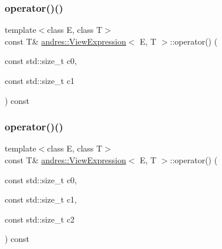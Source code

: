 \subsubsection{\texorpdfstring{operator()()}{operator()()}\hspace{0.1cm}{\footnotesize\ttfamily [2/5]}}
{\footnotesize\ttfamily template$<$class E, class T$>$ \\
const T\& \hyperlink{classandres_1_1ViewExpression}{andres\+::\+View\+Expression}$<$ E, T $>$\+::operator() (\begin{DoxyParamCaption}\item[{const std\+::size\+\_\+t}]{c0,  }\item[{const std\+::size\+\_\+t}]{c1 }\end{DoxyParamCaption}) const\hspace{0.3cm}{\ttfamily [inline]}}

\mbox{\label{classandres_1_1ViewExpression_a70a004e660132d2e014a7c9fba4e2f52}} 
\subsubsection{\texorpdfstring{operator()()}{operator()()}\hspace{0.1cm}{\footnotesize\ttfamily [3/5]}}
{\footnotesize\ttfamily template$<$class E, class T$>$ \\
const T\& \hyperlink{classandres_1_1ViewExpression}{andres\+::\+View\+Expression}$<$ E, T $>$\+::operator() (\begin{DoxyParamCaption}\item[{const std\+::size\+\_\+t}]{c0,  }\item[{const std\+::size\+\_\+t}]{c1,  }\item[{const std\+::size\+\_\+t}]{c2 }\end{DoxyParamCaption}) const\hspace{0.3cm}{\ttfamily [inline]}}

\mbox{\label{classandres_1_1ViewExpression_aefa796d758293ea9deee4307f7a3d3f0}} 

